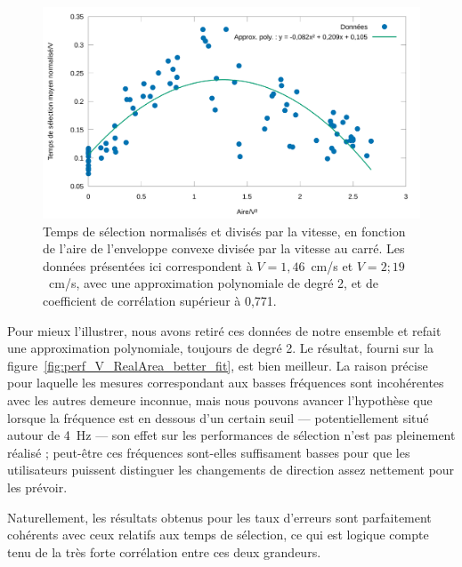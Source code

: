 	\begin{figure}[!htbp]
		\centering
		\includegraphics[width=\textwidth]{figures/ch4/perf_V_RealArea_lousy_fit}
		\caption[MTSN/V en fonction de l'aire/V² et approximation]{Temps de sélection normalisés et divisés par la vitesse, en fonction de l'aire de l'enveloppe convexe divisée par la vitesse au carré. Les données présentées ici correspondent à $V = 1,46$~cm/s et $V = 2;19$~cm/s, avec une approximation polynomiale de degré 2, et de coefficient de corrélation supérieur à 0,771.}
		\label{fig:perf_V_RealArea_lousy_fit}
	\end{figure}
	
	Pour mieux l'illustrer, nous avons retiré ces données de notre ensemble et refait une approximation polynomiale, toujours de degré 2. Le résultat, fourni sur la figure~\ref{fig:perf_V_RealArea_better_fit}, est bien meilleur. La raison précise pour laquelle les mesures correspondant aux basses fréquences sont incohérentes avec les autres demeure inconnue, mais nous pouvons avancer l'hypothèse que lorsque la fréquence est en dessous d'un certain seuil --- potentiellement situé autour de 4~Hz --- son effet sur les performances de sélection n'est pas pleinement réalisé ; peut-être ces fréquences sont-elles suffisament basses pour que les utilisateurs puissent distinguer les changements de direction assez nettement pour les prévoir.
	
	Naturellement, les résultats obtenus pour les taux d'erreurs sont parfaitement cohérents avec ceux relatifs aux temps de sélection, ce qui est logique compte tenu de la très forte corrélation entre ces deux grandeurs.
	
